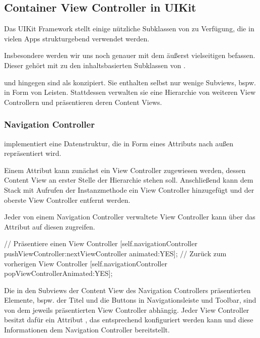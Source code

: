 \documentclass[parskip=half, final]{scrreprt}
\begin{document}
\subsection{Container View Controller in UIKit}

Das UIKit Framework stellt einige nützliche Subklassen von  zu Verfügung, die in vielen Apps strukturgebend verwendet werden.

Insbesondere werden wir uns noch genauer mit dem äußerst vielseitigen  befassen. Dieser gehört mit  zu den inhaltsbasierten Subklassen von .

 und  hingegen sind als  konzipiert. Sie enthalten selbst nur wenige Subviews, bspw. in Form von Leisten. Stattdessen verwalten sie eine Hierarchie von weiteren View Controllern und präsentieren deren Content Views.

\subsubsection{Navigation Controller}

 implementiert eine  Datenstruktur, die in Form eines Attributs  nach außen repräsentiert wird.

Einem Attribut  kann zunächst ein View Controller zugewiesen werden, dessen Content View an erster Stelle der Hierarchie stehen soll. Anschließend kann dem Stack mit Aufrufen der Instanzmethode  ein View Controller hinzugefügt und  der oberste View Controller entfernt werden.

Jeder von einem Navigation Controller verwaltete View Controller kann über das Attribut  auf diesen zugreifen.

\begin{objclst}
// Präsentiere einen View Controller
[self.navigationController pushViewController:nextViewController animated:YES];
// Zurück zum vorherigen View Controller
[self.navigationController popViewControllerAnimated:YES];
\end{objclst}

Die in den Subviews der Content View des Navigation Controllers präsentierten Elemente, bspw. der Titel und die Buttons in Navigationsleiste und Toolbar, sind von dem jeweils präsentierten View Controller abhängig. Jeder View Controller besitzt dafür ein Attribut , das entsprechend konfiguriert werden kann und diese Informationen dem Navigation Controller bereitstellt.
\end{document}
